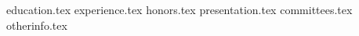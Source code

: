 \documentclass[11pt, letter]{awesome-cv}
\newcommand*{\sectiondir}{resume/}
\begin{document}
\makecvheader

{education.tex}
{experience.tex}
{honors.tex}
{presentation.tex}
{committees.tex}
{otherinfo.tex}
\end{document}
